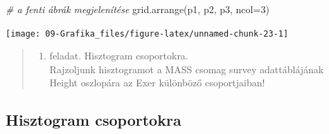 \documentclass[
]{book}
\newenvironment{Shaded}{\begin{snugshade}}{\end{snugshade}}
\newcommand{\AttributeTok}[1]{\textcolor[rgb]{0.77,0.63,0.00}{#1}}
\newcommand{\CommentTok}[1]{\textcolor[rgb]{0.56,0.35,0.01}{\textit{#1}}}
\newcommand{\DecValTok}[1]{\textcolor[rgb]{0.00,0.00,0.81}{#1}}
\newcommand{\FunctionTok}[1]{\textcolor[rgb]{0.00,0.00,0.00}{#1}}
\newcommand{\NormalTok}[1]{#1}
\providecommand{\tightlist}{%
  \setlength{\itemsep}{0pt}\setlength{\parskip}{0pt}}
\begin{document}
\begin{Shaded}
\begin{Highlighting}[]
\CommentTok{\# a fenti ábrák megjelenítése}
\FunctionTok{grid.arrange}\NormalTok{(p1, p2, p3, }\AttributeTok{ncol=}\DecValTok{3}\NormalTok{)}
\end{Highlighting}
\end{Shaded}

\begin{center}\texttt{[image: 09-Grafika\_files/figure-latex/unnamed-chunk-23-1]} \end{center}

\begin{quote}
\begin{enumerate}
\def\labelenumi{\arabic{enumi}.}
\setcounter{enumi}{1}
\tightlist
\item
  feladat. Hisztogram csoportokra.\\
  Rajzoljunk hisztogramot a MASS csomag survey adattáblájának Height oszlopára az Exer különböző csoportjaiban!
\end{enumerate}
\end{quote}

\hypertarget{hisztogram-csoportokra}{%
\subsection{Hisztogram csoportokra}\label{hisztogram-csoportokra}}
\end{document}
